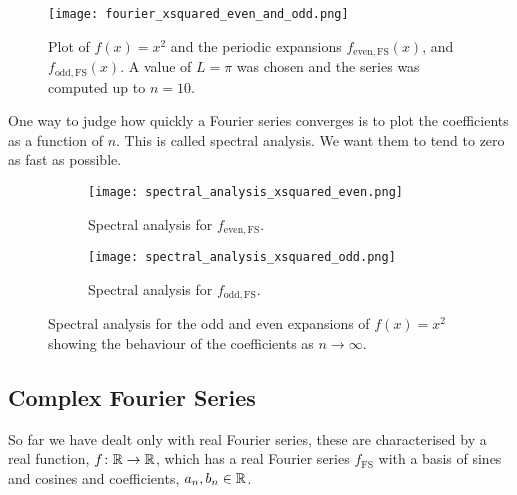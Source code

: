 \documentclass[a4paper]{article}
\newcommand{\FS}{{\mathrm{FS}}}
\begin{document}
    \begin{figure}[ht]
        \centering
        \texttt{[image: fourier\_xsquared\_even\_and\_odd.png]}
        \caption{Plot of \(f(x) = x^2\) and the periodic expansions \(f_{\text{even},\FS}(x)\), and \(f_{\text{odd},\FS}(x)\). A value of \(L = \pi\) was chosen and the series was computed up to \(n = 10\).}
    \end{figure}
    One way to judge how quickly a Fourier series converges is to plot the coefficients as a function of \(n\).
    This is called spectral analysis.
    We want them to tend to zero as fast as possible.
    \begin{figure}[ht]
        \centering
        \begin{subfigure}{0.45\textwidth}
            \centering
            \texttt{[image: spectral\_analysis\_xsquared\_even.png]}
            \caption{Spectral analysis for \(f_{\text{even},\FS}\).}
        \end{subfigure}
        \hspace{3em}
        \begin{subfigure}{0.45\textwidth}
            \centering
            \texttt{[image: spectral\_analysis\_xsquared\_odd.png]}
            \caption{Spectral analysis for \(f_{\text{odd},\FS}\).}
        \end{subfigure}
        \caption{Spectral analysis for the odd and even expansions of \(f(x) = x^2\) showing the behaviour of the coefficients as \(n \to\infty\).}
    \end{figure}
    
    \subsection{Complex Fourier Series}
    So far we have dealt only with real Fourier series, these are characterised by a real function, \(f\colon\mathbb{R}\to\mathbb{R}\), which has a real Fourier series \(f_\FS\) with a basis of sines and cosines and coefficients, \(a_n, b_n \in\mathbb{R}\).
    
\end{document}
